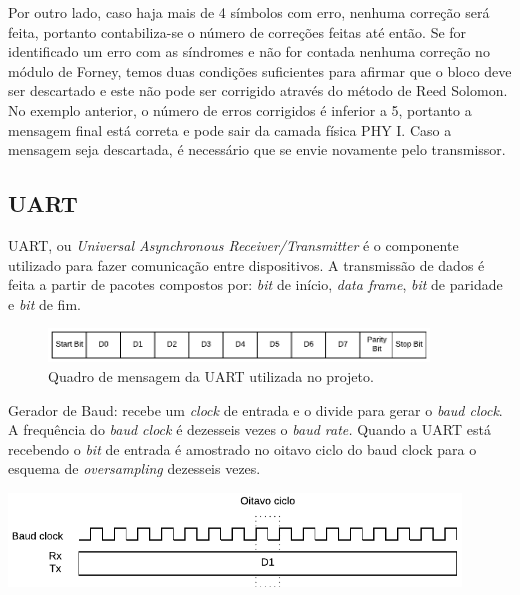 	Por outro lado, caso haja mais de 4 símbolos com erro, nenhuma correção será feita, portanto contabiliza-se o número de correções feitas até então. Se for identificado um erro com as síndromes e não for contada nenhuma correção no módulo de Forney, temos duas condições suficientes para afirmar que o bloco deve ser descartado e este não pode ser corrigido através do método de Reed Solomon. No exemplo anterior, o número de erros corrigidos é inferior a 5, portanto a mensagem final está correta e pode sair da camada física PHY I. Caso a mensagem seja descartada, é necessário que se envie novamente pelo transmissor.	
	
	\subsection{UART}
	
	UART, ou \textit{Universal Asynchronous Receiver/Transmitter} é o componente utilizado para fazer comunicação entre dispositivos. A transmissão de dados é feita a partir de pacotes compostos por: \textit{bit} de início, \textit{data frame}, \textit{bit} de paridade e \textit{bit} de fim.
	\begin{figure}[h]
		\caption{\label{figure:uart-frame}Quadro de mensagem da UART utilizada no projeto.}
		\centering
		\includegraphics[width=0.9\textwidth]{uart/frame.pdf}
	\end{figure}
	
	Gerador de Baud: recebe um \textit{clock} de entrada e o divide para gerar o \textit{baud clock}. A frequência do \textit{baud clock} é dezesseis vezes o \textit{baud rate.} Quando a UART está recebendo o \textit{bit} de entrada é amostrado no oitavo ciclo do baud clock para o esquema de \textit{oversampling} dezesseis vezes.
	
	\begin{chart}[h]
		\caption{\label{figure:uart-txrx}\textit{Oversampling} com \textit{baud clock}.}
		\centering
		\includegraphics[width=0.9\textwidth]{uart/txrx.pdf}
	\end{chart}
	
